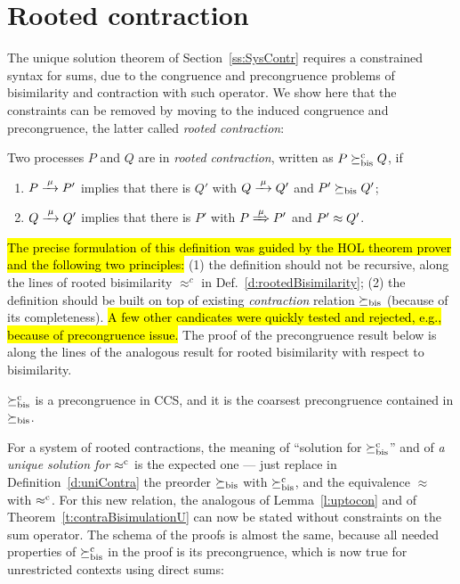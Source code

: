 \section{Rooted contraction}
\label{ss:new}

The unique solution theorem of Section~\ref{ss:SysContr} requires a
constrained syntax for sums, due to the congruence and precongruence
problems of bisimilarity and contraction with such operator. 
We show here that the constraints can be
removed by moving to the induced congruence and precongruence, the
latter called \emph{rooted contraction}:
\begin{definition}
\label{d:rcontra}
Two processes $P$ and $Q$ are in \emph{rooted contraction}, written as
 $P\mathrel{\succeq^{\rm{c}}_{\rm{bis}}} Q$, if
\begin{enumerate}
\item $P \arr\mu P'$ implies that there is $Q'$ with $Q \arr \mu Q'$
 and $P'\mathrel{\succeq_{\rm{bis}}} Q'$;
\item $Q \arr\mu Q'$   implies that there is $P'$ with $P \Arr \mu
 P'$ and $P' \approx Q'$.
\end{enumerate}
\end{definition}


\hl{The precise formulation of  this definition was guided by the HOL theorem
  prover and
the following two principles:} (1) the definition should not be recursive,
along the lines of rooted bisimilarity
$\approx^c$ in Def.~\ref{d:rootedBisimilarity};
(2) the definition should  be built on top of existing \emph{contraction}
relation $\mathrel{\succeq_{\rm{bis}}}$ (because of its completeness). 
\hl{A few other candicates were quickly tested and rejected, e.g.,
  because of  precongruence issue.} The proof of the precongruence
 result below is along the lines of the analogous result
for rooted bisimilarity with respect to bisimilarity.

\begin{theorem}
\label{t:rcontrPrecongruence}
$\mathrel{\succeq^{\rm{c}}_{\rm{bis}}}$ is a precongruence in CCS, and it is the
coarsest precongruence contained in $\mathrel{\succeq_{\rm{bis}}}$.
\end{theorem}  

For a system of rooted contractions, the meaning of 
``solution for $\mathrel{\succeq^{\rm{c}}_{\rm{bis}}}$'' and of \emph{a unique solution for $\mathrel{\approx^{\rm{c}}}$}
is the expected one --- just replace in Definition~\ref{d:uniContra}  the preorder 
$\mathrel{\succeq_{\rm{bis}}}$ with $\mathrel{\succeq^{\rm{c}}_{\rm{bis}}}$, and the equivalence 
$\approx$ with $\mathrel{\approx^{\rm{c}}}$.
%
For this new relation, the analogous of Lemma~\ref{l:uptocon} and of
Theorem~\ref{t:contraBisimulationU} can now be stated without constraints on the sum
operator.
The schema of the proofs is almost the same, because all needed
properties of $\mathrel{\succeq^{\rm{c}}_{\rm{bis}}}$ in the proof is its precongruence, which is
now true for unrestricted contexts using direct sums:

